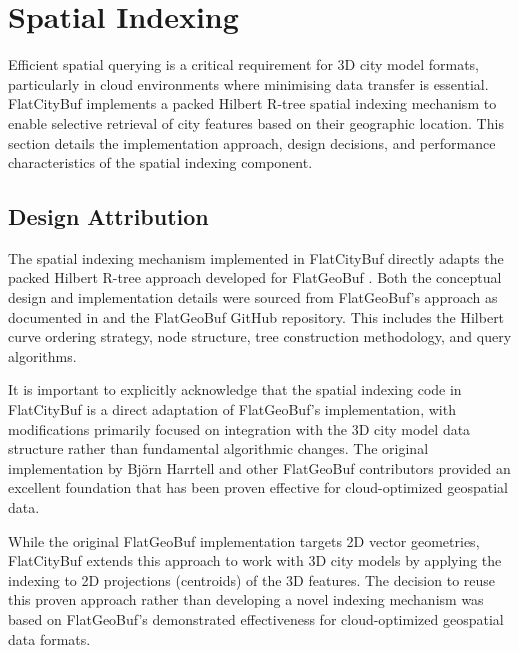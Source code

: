 
\section{Spatial Indexing}
\label{methodology:spatial_index}

Efficient spatial querying is a critical requirement for 3D city model formats, particularly in cloud environments where minimising data transfer is essential. FlatCityBuf implements a packed Hilbert R-tree spatial indexing mechanism \citep{Roussopoulos_Leifker_1985} to enable selective retrieval of city features based on their geographic location. This section details the implementation approach, design decisions, and performance characteristics of the spatial indexing component.

\subsection{Design Attribution}
\label{methodology:spatial_index:attribution}

The spatial indexing mechanism implemented in FlatCityBuf directly adapts the packed Hilbert R-tree approach developed for FlatGeoBuf \citep{flatgeobuf_spatial_index}. Both the conceptual design and implementation details were sourced from FlatGeoBuf's approach as documented in \citet{horance_2022} and the FlatGeoBuf GitHub repository. This includes the Hilbert curve ordering strategy, node structure, tree construction methodology, and query algorithms.

It is important to explicitly acknowledge that the spatial indexing code in FlatCityBuf is a direct adaptation of FlatGeoBuf's implementation, with modifications primarily focused on integration with the 3D city model data structure rather than fundamental algorithmic changes. The original implementation by Björn Harrtell and other FlatGeoBuf contributors \citep{flatgeobuf} provided an excellent foundation that has been proven effective for cloud-optimized geospatial data.

While the original FlatGeoBuf implementation targets 2D vector geometries, FlatCityBuf extends this approach to work with 3D city models by applying the indexing to 2D projections (centroids) of the 3D features. The decision to reuse this proven approach rather than developing a novel indexing mechanism was based on FlatGeoBuf's demonstrated effectiveness for cloud-optimized geospatial data formats.

